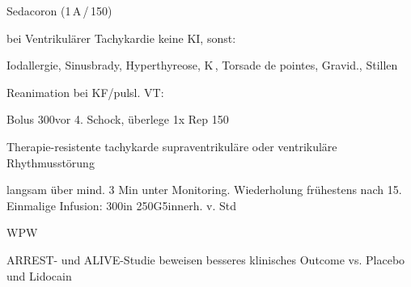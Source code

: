 {
\begin{MedikamentCharakteristika}
  \item[{\TxItemSpezialitaeten}] Sedacoron{\texttrademark} 
  (1\,A\,/\,150\Mg*)
\item[{\TxItemKontraindikation}]  bei Ventrikulärer Tachykardie keine 
KI, sonst:

Iodallergie, Sinusbrady, Hyperthyreose, K\,, Torsade
de pointes, Gravid., Stillen

\item[{\TxItemIndikation}] Reanimation bei KF/pulsl. VT:

\item[{\TxItemDosierung}]  Bolus 300\Mg* vor 4. Schock, überlege 1x 
Rep
150\Mg

\item[{\TxItemIndikation}] Therapie-resistente tachykarde 
supraventrikuläre oder ventrikuläre
Rhythmusstörung

\item[{\TxItemDosierung}] \MgKg* langsam über mind. 3 Min unter
Monitoring. Wiederholung frühestens nach 15\Min*.\newline
Einmalige Infusion: 300\Mg* in 250\Ml* G5\PC* innerh. v. 
 Std

\item[{\TxItemIndikation}] WPW

\item[{\TxItemDosierung}] \MgKgH

ARREST- und ALIVE-Studie beweisen besseres klinisches Outcome vs. 
Placebo und
Lidocain

\end{MedikamentCharakteristika}
}
{}






